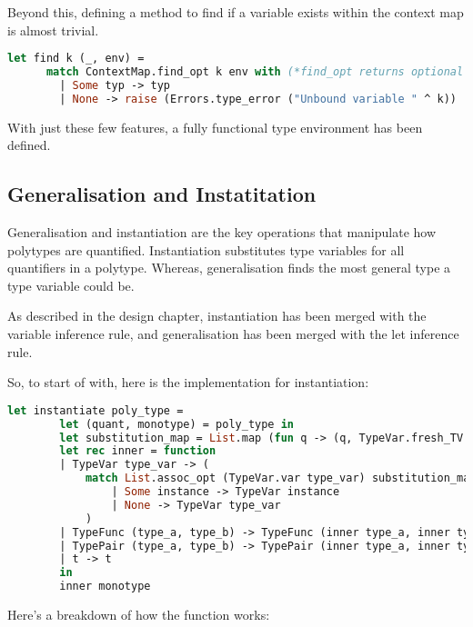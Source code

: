 \documentclass{l4proj}
\begin{document}
Beyond this, defining a method to find if a variable exists within the context map is almost trivial.

\begin{lstlisting}[language=Caml]
    let find k (_, env) = 
      match ContextMap.find_opt k env with (*find_opt returns optional type.*)
        | Some typ -> typ 
        | None -> raise (Errors.type_error ("Unbound variable " ^ k))
\end{lstlisting}

With just these few features, a fully functional type environment has been defined.

\subsection{Generalisation and Instatitation}

Generalisation and instantiation are the key operations that manipulate how polytypes are quantified.
Instantiation substitutes type variables for all quantifiers in a polytype.
Whereas, generalisation finds the most general type a type variable could be.

As described in the design chapter, instantiation has been merged with the variable inference rule, and generalisation has been merged with the let inference rule.

So, to start of with, here is the implementation for instantiation:
\begin{lstlisting}[language=Caml, caption=PyFunc's instantiation function.]
    let instantiate poly_type =
        let (quant, monotype) = poly_type in 
        let substitution_map = List.map (fun q -> (q, TypeVar.fresh_TV ())) quant in
        let rec inner = function
        | TypeVar type_var -> (
            match List.assoc_opt (TypeVar.var type_var) substitution_map with
                | Some instance -> TypeVar instance
                | None -> TypeVar type_var
            )
        | TypeFunc (type_a, type_b) -> TypeFunc (inner type_a, inner type_b)
        | TypePair (type_a, type_b) -> TypePair (inner type_a, inner type_b)
        | t -> t
        in
        inner monotype
\end{lstlisting}

Here's a breakdown of how the function works:
\end{document}
